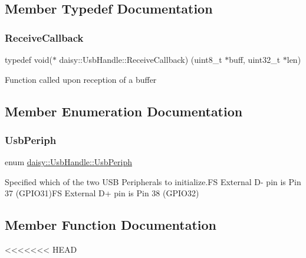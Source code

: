 \subsection{Member Typedef Documentation}
\mbox{\label{classdaisy_1_1_usb_handle_abd7ee9319fb0f5fa73f2c45e8ba14080}} 
\subsubsection{\texorpdfstring{Receive\+Callback}{ReceiveCallback}}
{\footnotesize\ttfamily typedef void($\ast$ daisy\+::\+Usb\+Handle\+::\+Receive\+Callback) (uint8\+\_\+t $\ast$buff, uint32\+\_\+t $\ast$len)}

Function called upon reception of a buffer 

\subsection{Member Enumeration Documentation}
\mbox{\label{classdaisy_1_1_usb_handle_ad2a37421ade061875a30765e2b2e1318}} 
\subsubsection{\texorpdfstring{Usb\+Periph}{UsbPeriph}}
{\footnotesize\ttfamily enum \hyperlink{classdaisy_1_1_usb_handle_ad2a37421ade061875a30765e2b2e1318}{daisy\+::\+Usb\+Handle\+::\+Usb\+Periph}}

Specified which of the two U\+SB Peripherals to initialize.\+FS External D-\/ pin is Pin 37 (G\+P\+I\+O31)FS External D+ pin is Pin 38 (G\+P\+I\+O32) 

\subsection{Member Function Documentation}
<<<<<<< HEAD
\mbox{\label{classdaisy_1_1_usb_handle_ab66484e20fbef1d7b1397403a69768ea}} 
